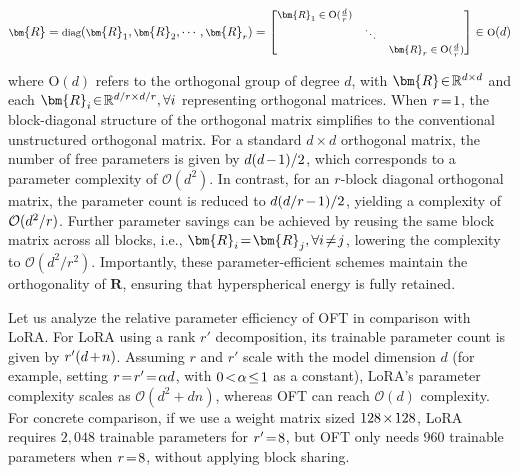 \begin{equation}
    \footnotesize
    \bm{R}=\text{diag}(\bm{R}_1,\bm{R}_2,\cdots,\bm{R}_r)=\begin{bmatrix}
    \bm{R}_1\in \text{O}(\frac{d}{r}) &  &\\
    &\ddots & \\
    & & \bm{R}_r\in \text{O}(\frac{d}{r})
    \end{bmatrix}\in \text{O}(d)
\end{equation}

where $\text{O}(d)$ refers to the orthogonal group of degree $d$, with $\thickmuskip=2mu \medmuskip=2mu \bm{R}\in\mathbb{R}^{d\times d}$ and each $\thickmuskip=2mu \medmuskip=2mu \bm{R}_i\in\mathbb{R}^{d/r\times d/r},\forall i$ representing orthogonal matrices. When $\thickmuskip=2mu \medmuskip=2mu r=1$, the block-diagonal structure of the orthogonal matrix simplifies to the conventional unstructured orthogonal matrix. For a standard $d\times d$ orthogonal matrix, the number of free parameters is given by $\thickmuskip=2mu \medmuskip=2mu d(d-1)/2$, which corresponds to a parameter complexity of $\mathcal{O}(d^2)$. In contrast, for an $r$-block diagonal orthogonal matrix, the parameter count is reduced to $\thickmuskip=2mu \medmuskip=2mu d(d/r-1)/2$, yielding a complexity of $\thickmuskip=2mu \medmuskip=2mu \mathcal{O}(d^2/r)$. Further parameter savings can be achieved by reusing the same block matrix across all blocks, i.e., $\thickmuskip=2mu \medmuskip=2mu \bm{R}_i = \bm{R}_j, \forall i\neq j$, lowering the complexity to $\mathcal{O}(d^2/r^2)$. Importantly, these parameter-efficient schemes maintain the orthogonality of $\bm{R}$, ensuring that hyperspherical energy is fully retained.

Let us analyze the relative parameter efficiency of OFT in comparison with LoRA. For LoRA using a rank $r'$ decomposition, its trainable parameter count is given by $\thickmuskip=2mu \medmuskip=2mu r'(d+n)$. Assuming $r$ and $r'$ scale with the model dimension $d$ (for example, setting $\thickmuskip=2mu \medmuskip=2mu r = r' = \alpha d$, with $\thickmuskip=2mu \medmuskip=2mu 0<\alpha \leq 1$ as a constant), LoRA's parameter complexity scales as $\mathcal{O}(d^2+dn)$, whereas OFT can reach $\mathcal{O}(d)$ complexity. For concrete comparison, if we use a weight matrix sized $\thickmuskip=2mu \medmuskip=2mu 128\times 128$, LoRA requires $2,048$ trainable parameters for $\thickmuskip=2mu \medmuskip=2mu r'=8$, but OFT only needs $960$ trainable parameters when $\thickmuskip=2mu \medmuskip=2mu r=8$, without applying block sharing.

